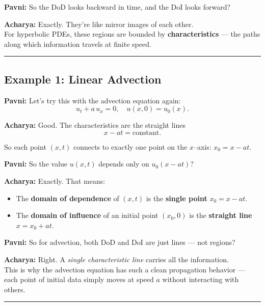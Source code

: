 \documentclass[
  letterpaper,
]{book}
\providecommand{\tightlist}{%
  \setlength{\itemsep}{0pt}\setlength{\parskip}{0pt}}
\begin{document}
\textbf{Pavni:} So the DoD looks backward in time, and the DoI looks
forward?

\textbf{Acharya:} Exactly. They're like mirror images of each other.\\
For hyperbolic PDEs, these regions are bounded by
\textbf{characteristics} --- the paths along which information travels
at finite speed.

\begin{center}\rule{0.5\linewidth}{0.5pt}\end{center}

\subsection{Example 1: Linear
Advection}\label{example-1-linear-advection}

\textbf{Pavni:} Let's try this with the advection equation again:\\
\[
u_t + a\,u_x = 0, \quad u(x,0) = u_0(x).
\]

\textbf{Acharya:} Good. The characteristics are the straight lines \[
x - a t = \text{constant}.
\]

So each point \((x,t)\) connects to exactly one point on the
\(x\)--axis: \(x_0 = x - a t\).

\textbf{Pavni:} So the value \(u(x,t)\) depends only on
\(u_0(x - a t)\)?

\textbf{Acharya:} Exactly. That means:

\begin{itemize}
\tightlist
\item
  The \textbf{domain of dependence} of \((x,t)\) is the \textbf{single
  point} \(x_0 = x - a t\).\\
\item
  The \textbf{domain of influence} of an initial point \((x_0,0)\) is
  the \textbf{straight line} \(x = x_0 + a t\).
\end{itemize}

\textbf{Pavni:} So for advection, both DoD and DoI are just lines ---
not regions?

\textbf{Acharya:} Right. A \emph{single characteristic line} carries all
the information.\\
This is why the advection equation has such a clean propagation behavior
--- each point of initial data simply moves at speed \(a\) without
interacting with others.

\begin{center}\rule{0.5\linewidth}{0.5pt}\end{center}
\end{document}
